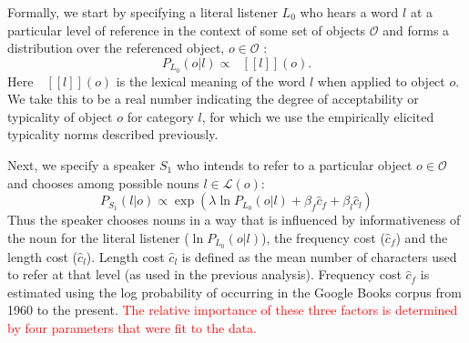 \documentclass[10pt,letterpaper]{article}
\newcommand{\red}[1]{\textcolor{Red}{#1}}
\newcommand{\ndg}[1]{\textcolor{Green}{[ndg: #1]}}
\newcommand{\denote}[1]{\mbox{ $[\![ #1 ]\!]$}}
\begin{document}
Formally, we start by specifying a literal listener $L_0$ who hears a word $l$ at a particular level of reference  in the context of some set of objects $\mathcal{O}$ and forms a distribution over the referenced object, $o \in \mathcal{O}$ : 
$$P_{L_0}(o | l) \propto \denote{l}(o).$$
Here $\denote{l}(o)$ is the lexical meaning of the word $l$ when applied to object $o$. We take this to be a real number indicating the degree of acceptability or typicality of object $o$ for category $l$, for which we use the empirically elicited typicality norms described previously. %

Next, we specify a speaker $S_1$ who intends to refer to a particular object $o \in \mathcal{O}$ and chooses among possible nouns $l \in {\mathcal L}(o)$: 
$$P_{S_1}(l | o) \propto \exp(\lambda \ln P_{L_0}(o | l) + \beta_f \hat{c}_f  + \beta_l \hat{c}_l)$$
Thus the speaker chooses nouns in a way that is influenced by informativeness of the noun for the literal listener ($\ln P_{L_0}(o | l)$), the frequency cost ($\hat{c}_f$) and the length cost ($\hat{c}_l$).
Length cost $\hat{c}_l$ is defined as the mean number of characters used to refer at that level (as used in the previous analysis). 
Frequency cost $\hat{c}_f$ is estimated using the log probability of occurring in the Google Books corpus from 1960 to the present. \red{The relative importance of these three factors is determined by four parameters that were fit to the data.}

\end{document}
